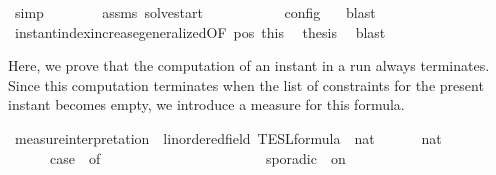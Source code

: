 \begin{isabellebody}
\ simp\isanewline
\ \ \ \ \ \ \isamarkupfalse%
\ assms\ solve{\isacharunderscore}start\ \isamarkupfalse%
\ {\isacartoucheopen}{\isasymrho}\ {\isasymin}\ {\isasymlbrakk}\ {\isacharbrackleft}{\isacharbrackright}{\isacharcomma}\ {}\ {\isasymturnstile}\ {\isasymPsi}\ {\isasymtriangleright}\ {\isacharbrackleft}{\isacharbrackright}\ {\isasymrbrakk}\isactrlsub c\isactrlsub o\isactrlsub n\isactrlsub f\isactrlsub i\isactrlsub g\ {\isacartoucheclose}\ \isamarkupfalse%
\ blast\isanewline
\ \ \ \ \ \ \isamarkupfalse%
\ instant{\isacharunderscore}index{\isacharunderscore}increase{\isacharunderscore}generalized{\isacharbrackleft}OF\ pos\ this{\isacharbrackright}\ \isamarkupfalse%
\ {\isacharquery}thesis\ \isamarkupfalse%
\ blast\isanewline
\ \ \isamarkupfalse%
\isanewline
{}\isamarkupfalse%
%
\endisatagproof
{\isafoldproof}%
%
\isadelimproof
%
\endisadelimproof
%
\isadelimdocument
%
\endisadelimdocument
%
\isatagdocument
%
\isamarkuptrue%
%
\endisatagdocument
{\isafolddocument}%
%
\isadelimdocument
%
\endisadelimdocument
%
\begin{isamarkuptext}%
Here, we prove that the computation of an instant in a run always terminates.
  Since this computation terminates when the list of constraints for the present
  instant becomes empty, we introduce a measure for this formula.%
\end{isamarkuptext}\isamarkuptrue%
\isamarkupfalse%
\ measure{\isacharunderscore}interpretation\ {\isacharcolon}{\isacharcolon}\ {\isacartoucheopen}{\isacharprime}{\isasymtau}{\isacharcolon}{\isacharcolon}linordered{\isacharunderscore}field\ TESL{\isacharunderscore}formula\ {\isasymRightarrow}\ nat{\isacartoucheclose}\ {\isacharparenleft}{\isacartoucheopen}{\isasymmu}{\isacartoucheclose}{\isacharparenright}\isanewline
{}\isanewline
\ \ {\isacartoucheopen}{\isasymmu}\ {\isacharbrackleft}{\isacharbrackright}\ {\isacharequal}\ {\isacharparenleft}{}{\isacharcolon}{\isacharcolon}nat{\isacharparenright}{\isacartoucheclose}\isanewline
{\isacharbar}\ {\isacartoucheopen}{\isasymmu}\ {\isacharparenleft}{\isasymphi}\ {\isacharhash}\ {\isasymPhi}{\isacharparenright}\ {\isacharequal}\ {\isacharparenleft}case\ {\isasymphi}\ of\isanewline
\ \ \ \ \ \ \ \ \ \ \ \ \ \ \ \ \ \ \ \ \ \ {\isacharunderscore}\ sporadic\ {\isacharunderscore}\ on\ {\isacharunderscore}\ {\isasymRightarrow}\ {}\ {\isacharplus}\ {\isasymmu}\ {\isasymPhi}\isanewline

\end{isabellebody}
